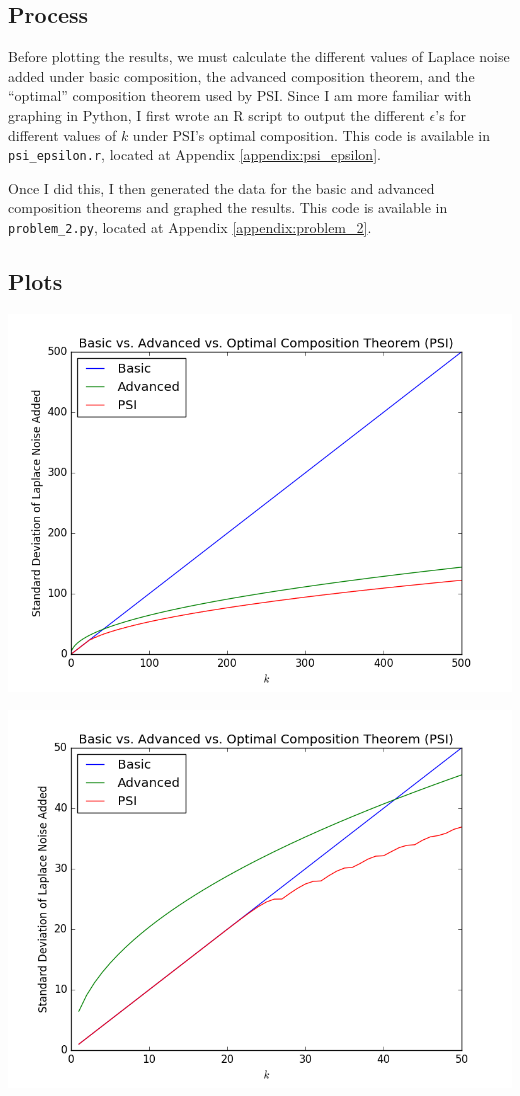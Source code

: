 \documentclass[12pt]{article}
\def\cl{\lstinline}
\begin{document}
\subsection{Process}

\noindent

Before plotting the results, we must calculate the different values of Laplace noise added under basic composition, the advanced composition theorem, and the ``optimal'' composition theorem used by PSI. Since I am more familiar with graphing in Python, I first wrote an R script to output the different $\epsilon$'s for different values of $k$ under PSI's optimal composition. This code is available in \cl{psi_epsilon.r}, located at Appendix \ref{appendix:psi_epsilon}.

\bigskip

Once I did this, I then generated the data for the basic and advanced composition theorems and graphed the results. This code is available in \cl{problem_2.py}, located at Appendix \ref{appendix:problem_2}.

\subsection{Plots}

\includegraphics[scale=0.6]{problem_2_wide.png}

\includegraphics[scale=0.6]{problem_2_close.png}
\end{document}
